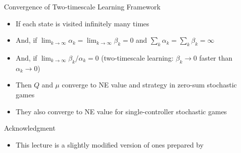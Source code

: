 \documentclass[11pt,aspectratio=169]{beamer}
\begin{document}
  
  \begin{frame}{Convergence of Two-timescale Learning Framework}
   \begin{itemize}
   \setlength{\itemsep}{1em}
    \item If each state is visited \alert{infinitely} many times
    \item And, if $\lim_{k\to \infty} \alpha_k = \lim_{k\to \infty} \beta_k = 0$ and $\sum_k \alpha_k = \sum_k \beta_k = \infty$
    \item And, if $\lim_{k\to \infty} \beta_k / \alpha_k = 0$ (two-timescale learning: $\beta_k \to 0$ faster than $\alpha_k \to 0$)
    \item Then $Q$ and $\mu$ converge to NE value and strategy in zero-sum stochastic games
    \item They also converge to NE value for single-controller stochastic games
   \end{itemize}
  \end{frame}
  

  \begin{frame}{Acknowledgment}
   \begin{itemize}
    \setlength{\itemsep}{1em}
    \item This lecture is a slightly modified version of ones prepared by
   \end{itemize}
  \end{frame}
  
  
\end{document}
